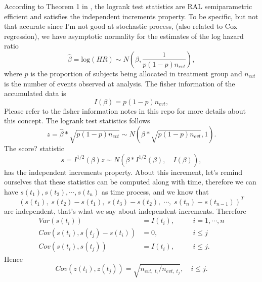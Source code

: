 \documentclass[a4paper,12pt]{article}
\begin{document}
According to Theorem 1 in \citet{Scharfstein1997p1342-1350}, the logrank test statistics are RAL semiparametric efficient and satisfies the independent increments property. To be specific, but not that accurate since I'm not good at stochastic process, (also related to Cox regression),
we have asymptotic normality for the estimates of the log hazard ratio
\[
  \hat{\beta} = \mathrm{log}\left(HR\right) \sim
  N\left(\beta, \frac{1}{p\left(1 - p\right)n_{evt}}\right)
  ,
\]
where $p$ is the proportion of subjects being allocated in treatment group and $n_{evt}$ is the number of events observed at analysis. The fisher information of the accumulated data is
\[
  I\left(\beta\right) = p\left(1 - p\right)n_{evt}
  ,
\]
Please refer to the {\color{red}fisher information notes} in this repo for more details about this concept. The logrank test statistics follows
\[
  z = \hat{\beta} * \sqrt{p\left(1 - p\right)n_{evt}}
  \sim N\left(
    \beta * \sqrt{p\left(1 - p\right)n_{evt}}, 1
  \right)
  .
\]
The score? statistic
\[
  s = I^{1/2}\left(\beta\right) z
  \sim N\left(\beta * I^{1/2}\left(\beta\right)
    ,\quad
    I\left(\beta\right)
  \right)
  ,
\]
has the independent increments property. About this increment, let's remind ourselves that these statistics can be computed along with time, therefore we can have $s(t_1), s(t_2), \cdots, s(t_n)$ as time process, and we know that
\[
  \left(
    s\left(t_1\right),\;
    s\left(t_2\right) - s\left(t_1\right),\;
    s\left(t_3\right) - s\left(t_2\right),\;
    \cdots,\;
    s\left(t_n\right) - s\left(t_{n - 1}\right)
  \right)^T
\]
are independent, that's what we say about independent increments. Therefore
\[
  \begin{aligned}
    Var\left(s\left(t_i\right)\right) &= I\left(t_i\right)
    ,\quad && i = 1, \cdots, n    \\
    Cov\left(s\left(t_i\right), s\left(t_j\right) - s\left(t_i\right)\right) &= 0
    ,\quad && i\leq j    \\
    Cov\left(s\left(t_i\right), s\left(t_j\right)\right) &= I\left(t_i\right)
    ,\quad && i\leq j
    .
  \end{aligned}
\]
Hence
\[
  Cov\left(z\left(t_i\right), z\left(t_j\right)\right) = \sqrt{n_{evt,\;t_i}/n_{evt,\;t_j}}
  ,\quad i \leq j
  .
\]







\end{document}
